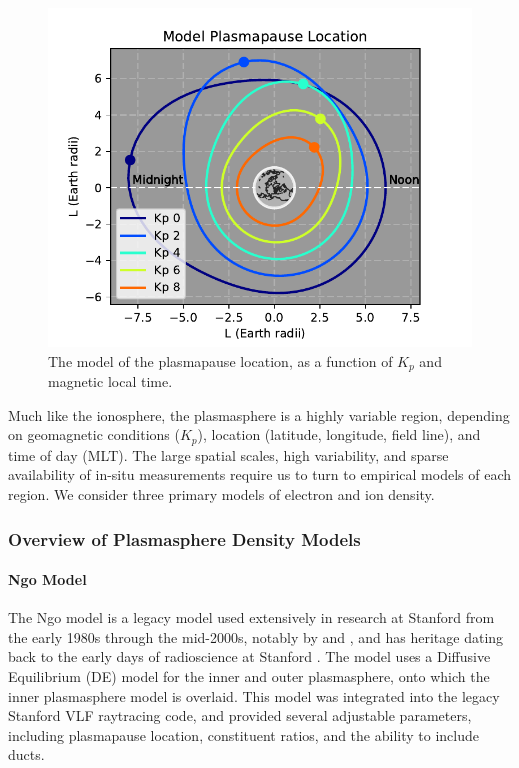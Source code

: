\begin{figure}[h]
\begin{center}
\includegraphics{figures/plasmapause}
\caption[Model of plasmapause location]{The \cite{Gallagher1999} model of the plasmapause location, as a function of $K_p$ and magnetic local time.}
\label{fig:plasmapause}
\end{center}
\end{figure}


Much like the ionosphere, the plasmasphere is a highly variable region, depending on geomagnetic conditions ($K_p$), location (latitude, longitude, field line), and time of day (MLT). The large spatial scales, high variability, and sparse availability of in-situ measurements require us to turn to empirical models of each region. We consider three primary models of electron and ion density.

\subsubsection{Overview of Plasmasphere Density Models}
\label{section:plasmasphere_density_models}
\paragraph{Ngo Model}

The Ngo model is a legacy model used extensively in research at Stanford from the early 1980s through the mid-2000s, notably by \cite{Lauben1998} and \cite{Bortnik2005}, and has heritage dating back to the early days of radioscience at Stanford \citep{Kimura1966}. The model uses a Diffusive Equilibrium (DE) \citep{Angerami1963} model for the inner and outer plasmasphere, onto which the \cite{Carpenter1992} inner plasmasphere model is overlaid. This model was integrated into the legacy Stanford VLF raytracing code, and provided several adjustable parameters, including plasmapause location, constituent ratios, and the ability to include ducts.


